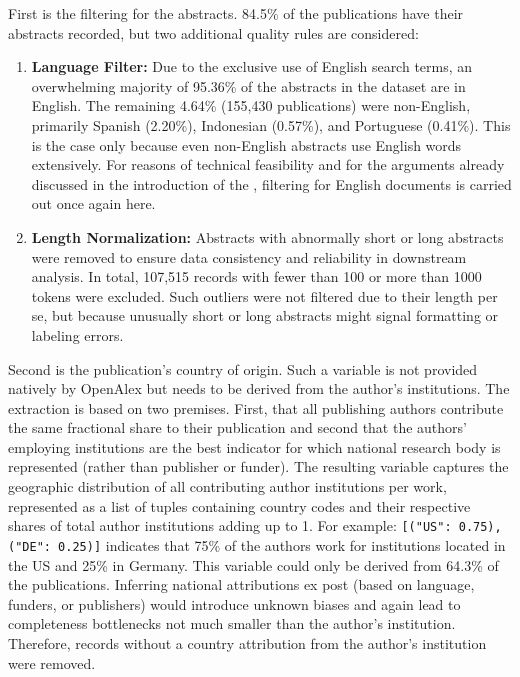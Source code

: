 \documentclass{article}
\begin{document}
	
	First is the filtering for the abstracts. 84.5\% of the publications have their abstracts recorded, but two additional quality rules are considered:
	\begin{enumerate}
		\item \textbf{Language Filter:} Due to the exclusive use of English search terms, an overwhelming majority of 95.36\% of the abstracts in the dataset are in English. The remaining 4.64\% (155,430 publications) were non-English, primarily Spanish (2.20\%), Indonesian (0.57\%), and Portuguese (0.41\%). This is the case only because even non-English abstracts use English words extensively.
		For reasons of technical feasibility and for the arguments already discussed in the introduction of the , filtering for English documents is carried out once again here.	
		\item \textbf{Length Normalization:} Abstracts with abnormally short or long abstracts were removed to ensure data consistency and reliability in downstream analysis. In total, 107,515 records with fewer than 100 or more than 1000 tokens were excluded. Such outliers were not filtered due to their length per se, but because unusually short or long abstracts might signal formatting or labeling errors.	
	\end{enumerate}
	
	Second is the publication's country of origin. Such a variable is not provided natively by OpenAlex but needs to be derived from the author's institutions. The extraction is based on two premises. First, that all publishing authors contribute the same fractional share to their publication and second that the authors' employing institutions are the best indicator for which national research body is represented (rather than publisher or funder). The resulting variable captures the geographic distribution of all contributing author institutions per work, represented as a list of tuples containing country codes and their respective shares of total author institutions adding up to 1. For example: \texttt{[("US": 0.75), ("DE": 0.25)]} indicates that 75\% of the authors work for institutions located in the US and 25\% in Germany. This variable could only be derived from 64.3\% of the publications. Inferring national attributions ex post (based on language, funders, or publishers) would introduce unknown biases and again lead to completeness bottlenecks not much smaller than the author's institution. Therefore, records without a country attribution from the author's institution were removed.
	
\end{document}
